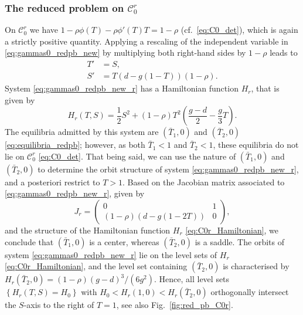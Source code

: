 \documentclass[a4paper,10pt,abstract=true,parskip=true]{scrartcl}
\theoremstyle{remark}
\numberwithin{equation}{section}
\numberwithin{thm}{section}
\begin{document}
\subsubsection{The reduced problem on \texorpdfstring{$\mathcal{C}_0^r$}{C0r}}
On $\mathcal{C}_0^r$ we have \mbox{$1-\rho \phi(T)-\rho \phi'(T)T = 1-\rho$} (cf.~\eqref{eq:C0_det}), which is again a strictly positive quantity. Applying a rescaling of the independent variable in \eqref{eq:gammas0_redpb_new} by multiplying both right-hand sides by $1-\rho$ leads to
\begin{subequations}\label{eq:gammas0_redpb_new_r}
    \begin{align}
        T' &= S,\\
        S' &= T\left( d-g(1-T)\right)(1-\rho).
    \end{align}
\end{subequations}
System \eqref{eq:gammas0_redpb_new_r} has a Hamiltonian function $H_r$, that is given by
\begin{equation}\label{eq:C0r_Hamiltonian}
    H_r(T,S) = \frac{1}{2}S^2 + (1-\rho)T^2 \left(\frac{g-d}{2} - \frac{g}{3}T \right).
\end{equation}
The equilibria admitted by this system are $(\bar{T}_1,0)$ and $(\bar{T}_2,0)$ \eqref{eq:equilibria_redpb}; however, as both $\bar{T}_1 < 1$ and $\bar{T}_2<1$, these equilibria do not lie on $\mathcal{C}_0^r$ \eqref{eq:C0_det}. That being said, we can use the nature of $(\bar{T}_1,0)$ and $(\bar{T}_2,0)$ to determine the orbit structure of system \eqref{eq:gammas0_redpb_new_r}, and a posteriori restrict to $T>1$. Based on the Jacobian matrix associated to \eqref{eq:gammas0_redpb_new_r}, given by
\begin{equation}
J_r = \begin{pmatrix}
    0 & 1 \\
    (1-\rho)\left(d-g(1-2T)\right) & 0
\end{pmatrix},
\end{equation}
and the structure of the Hamiltonian function $H_r$ \eqref{eq:C0r_Hamiltonian}, we conclude that $(\bar{T}_1,0)$ is a center, whereas $(\bar{T}_2,0)$ is a saddle. The orbits of system \eqref{eq:gammas0_redpb_new_r} lie on the level sets of $H_r$ \eqref{eq:C0r_Hamiltonian}, and the level set containing $(\bar{T}_2,0)$ is characterised by $H_r(\bar{T}_2,0) = (1-\rho)(g-d)^3/(6g^2)$. Hence, all level sets $\left\{H_r(T,S) = H_0\right\}$ with $H_0 < H_r(1,0) < H_r(\bar{T}_2,0)$ orthogonally intersect the $S$-axis to the right of $T=1$, see also Fig.~\ref{fig:red_pb_C0r}.\\
\end{document}
